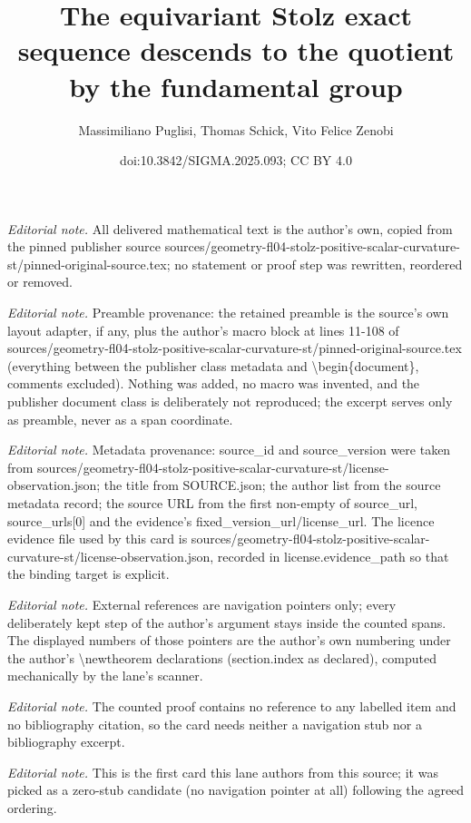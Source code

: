 \documentclass[10pt,a4paper]{amsart}
\title{The equivariant Stolz exact sequence descends to the quotient by the fundamental group}
\author{Massimiliano Puglisi, Thomas Schick, Vito Felice Zenobi}
\date{doi:10.3842/SIGMA.2025.093; CC BY 4.0}
\begin{document}
\maketitle
\noindent\textit{Editorial note.} All delivered mathematical text is the author's own, copied from the pinned publisher source sources/geometry-fl04-stolz-positive-scalar-curvature-st/pinned-original-source.tex; no statement or proof step was rewritten, reordered or removed.\par\medskip
\noindent\textit{Editorial note.} Preamble provenance: the retained preamble is the source's own layout adapter, if any, plus the author's macro block at lines 11-108 of sources/geometry-fl04-stolz-positive-scalar-curvature-st/pinned-original-source.tex (everything between the publisher class metadata and \textbackslash{}begin\{document\}, comments excluded). Nothing was added, no macro was invented, and the publisher document class is deliberately not reproduced; the excerpt serves only as preamble, never as a span coordinate.\par\medskip
\noindent\textit{Editorial note.} Metadata provenance: source\_id and source\_version were taken from sources/geometry-fl04-stolz-positive-scalar-curvature-st/license-observation.json; the title from SOURCE.json; the author list from the source metadata record; the source URL from the first non-empty of source\_url, source\_urls[0] and the evidence's fixed\_version\_url/license\_url. The licence evidence file used by this card is sources/geometry-fl04-stolz-positive-scalar-curvature-st/license-observation.json, recorded in license.evidence\_path so that the binding target is explicit.\par\medskip
\noindent\textit{Editorial note.} External references are navigation pointers only; every deliberately kept step of the author's argument stays inside the counted spans. The displayed numbers of those pointers are the author's own numbering under the author's \textbackslash{}newtheorem declarations (section.index as declared), computed mechanically by the lane's scanner.\par\medskip
\noindent\textit{Editorial note.} The counted proof contains no reference to any labelled item and no bibliography citation, so the card needs neither a navigation stub nor a bibliography excerpt.\par\medskip
\noindent\textit{Editorial note.} This is the first card this lane authors from this source; it was picked as a zero-stub candidate (no navigation pointer at all) following the agreed ordering.\par\medskip
\end{document}
